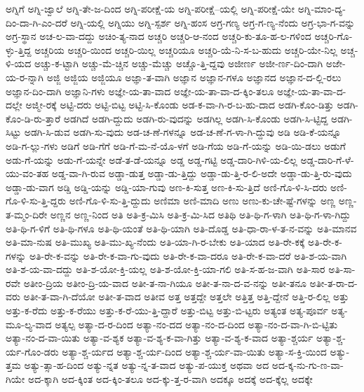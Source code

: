 {ಅಗ್ನಿಗೆ
ಅಗ್ನಿ-ಜ್ವಾಲೆ
ಅಗ್ನಿ-ತೇ-ಜ-ದಿಂದ
ಅಗ್ನಿ-ಪರೀಕ್ಷೆ-ಯ
ಅಗ್ನಿ-ಪರೀಕ್ಷೆ--ಯಲ್ಲಿ
ಅಗ್ನಿ-ಪರೀಕ್ಷೆ-ಯೇ
ಅಗ್ನಿ-ಮಾಂ-ದ್ಯ-ದಿಂ-ದಾ-ಗಿ-ಎಂ-ದರೆ
ಅಗ್ನಿ-ಯಲ್ಲಿ
ಅಗ್ನಿಯು
ಅಗ್ನಿ-ಸ್ಪರ್ಶ
ಅಗ್ನಿ-ಹಂಸ
ಅಗ್ರ-ಗಣ್ಯ
ಅಗ್ರ-ಗ-ಣ್ಯ-ನೆಂದು
ಅಗ್ರ-ಭಾ-ಗ-ವನ್ನು
ಅಗ್ರ-ಸ್ಥಾನ
ಅಚ-ಲ-ವಾ-ದದ್ದು
ಅಚಿಂ-ತ್ಯ-ನಾದ
ಅಚ್ಚರಿ
ಅಚ್ಚರಿ-ಆ-ನಂದ
ಅಚ್ಚರಿ-ಕು-ತೂ-ಹ-ಲ-ಗಳಿಂದ
ಅಚ್ಚರಿ-ಗೊ-ಳ್ಳು-ತ್ತಿದ್ದ
ಅಚ್ಚರಿಯ
ಅಚ್ಚರಿ-ಯಿಂದ
ಅಚ್ಚರಿ-ಯಿಲ್ಲ
ಅಚ್ಚರಿಯೂ
ಅಚ್ಚರಿ-ಯೆ-ನಿ-ಸ-ಬ-ಹುದು
ಅಚ್ಚರಿ-ಯೇ-ನಿಲ್ಲ
ಅಚ್ಚ-ಳಿ-ಯದ
ಅಚ್ಚು-ಕ-ಟ್ಟಾಗಿ
ಅಚ್ಚು-ಮೆ-ಚ್ಚಿನ
ಅಚ್ಚು-ಮೆಚ್ಚು
ಅಚ್ಚೊ-ತ್ತಿ-ದ್ದವು
ಅಜೀರ್ಣ
ಅಜೀ-ರ್ಣ-ದಿಂ-ದಾಗಿ
ಅಜೇ-ಯ-ರ-ನ್ನಾಗಿ
ಅಜ್ಜಿ
ಅಜ್ಜಿಯ
ಅಜ್ಜಿಯೂ
ಅಜ್ಞಾ-ತ-ವಾಗಿ
ಅಜ್ಞಾನ
ಅಜ್ಞಾನ-ಗಳೂ
ಅಜ್ಞಾನದ
ಅಜ್ಞಾನ-ದ-ಲ್ಲಿ-ರಲು
ಅಜ್ಞಾನ-ದಿಂ-ದಾಗಿ
ಅಜ್ಞಾನಿ-ಗಳು
ಅಜ್ಞೇ-ಯ-ತಾ-ವಾದ
ಅಜ್ಞೇ-ಯ-ತಾ-ವಾ-ದ-ಕ್ಕಿಂ-ತಲೂ
ಅಜ್ಞೇ-ಯ-ತಾ-ವಾ-ದ-ದಲ್ಲೇ
ಅಜ್ಮೀ-ರಕ್ಕೆ
ಅಟ್ಟಿ-ದರು
ಅಟ್ಟಿ-ಬಿಟ್ಟ
ಅಟ್ಟಿ-ಸಿ-ಕೊಂಡು
ಅಡ-ಕ-ವಾ-ಗಿ-ರ-ಬ-ಹು-ದಾದ
ಅಡಗಿ-ಕೊಂ-ಡಿತ್ತು
ಅಡಗಿ-ಕೊಂ-ಡಿ-ರು-ತ್ತಾರೆ
ಅಡಗಿದೆ
ಅಡಗಿ-ದ್ದುದು
ಅಡಗಿ-ರು-ವುದನ್ನು
ಅಡಗಿಲ್ಲ
ಅಡಗಿ-ಸಿ-ಕೊಂಡು
ಅಡಗಿ-ಸಿ-ಟ್ಟಿದ್ದ
ಅಡಗಿ-ಸಿಟ್ಟು
ಅಡಗಿ-ಸಿ-ಡುವ
ಅಡಗಿ-ಸು-ವುದು
ಅಡ-ಚ-ಣೆ-ಗಳನ್ನೂ
ಅಡ-ಚ-ಣೆ-ಗ-ಳಾ-ಗಿ-ದ್ದುವು
ಅಡಿ
ಅಡಿ-ಕೆ-ಯನ್ನೂ
ಅಡಿ-ಗ-ಲ್ಲು-ಗಳು
ಅಡಿಗೆ
ಅಡಿ-ಗೆಗೆ
ಅಡಿ-ಗೆ-ಮ-ನೆ-ಯೊ-ಳಗೆ
ಅಡಿ-ಗೆಯ
ಅಡಿ-ಗೆ-ಯನ್ನು
ಅಡಿ-ಯಿ-ಡಲು
ಅಡುಗೆ
ಅಡು-ಗೆ-ಯನ್ನು
ಅಡು-ಗೆ-ಯನ್ನೇ
ಅಡೆ-ತ-ಡೆ-ಯನ್ನೂ
ಅಡ್ಡ
ಅಡ್ಡ-ಗಟ್ಟಿ
ಅಡ್ಡ-ದಾರಿ-ಗಿಳಿ-ಯ-ಲಿಲ್ಲ
ಅಡ್ಡ-ದಾರಿ-ಗೆ-ಳೆ-ಯು-ವಂ-ತಹ
ಅಡ್ಡ-ವಾ-ಗಿ-ರುವ
ಅಡ್ಡಾ-ಡುತ್ತ
ಅಡ್ಡಾ-ಡು-ತ್ತಿದ್ದು
ಅಡ್ಡಾ-ಡು-ತ್ತಿ-ರ-ಲಿ-ಅದೇ
ಅಡ್ಡಾ-ಡು-ತ್ತಿ-ರು-ವುದು
ಅಡ್ಡಾ-ಡು-ವಾಗ
ಅಡ್ಡಿ
ಅಡ್ಡಿ-ಯನ್ನು
ಅಡ್ಡಿ-ಯಾ-ಗುವು
ಅಣ-ಕಿ-ಸುತ್ತ
ಅಣ-ಕಿ-ಸು-ತ್ತಿದೆ
ಅಣಿ-ಗೊ-ಳಿ-ಸಿ-ದರು
ಅಣಿ-ಗೊ-ಳಿ-ಸು-ತ್ತಿ-ದ್ದರು
ಅಣಿ-ಗೊ-ಳಿ-ಸು-ತ್ತಿ-ದ್ದುದು
ಅಣಿಮಾ
ಅಣಿ-ಮಾದಿ
ಅಣು
ಅಣು-ಕು-ಚೇ-ಷ್ಟೆ-ಗಳನ್ನು
ಅಣ್ಣ
ಅಣ್ಣ-ತ-ಮ್ಮಂ-ದಿರೇ
ಅಣ್ಣನ
ಅಣ್ಣ-ನಿಂದ
ಅತಿ
ಅತಿ-ಕ್ರ-ಮಿಸಿ
ಅತಿ-ಕ್ರ-ಮಿ-ಸಿದ
ಅತಿಥಿ
ಅತಿ-ಥಿ-ಗ-ಳಾಗಿ
ಅತಿ-ಥಿ-ಗ-ಳಾ-ಗಿದ್ದು
ಅತಿ-ಥಿ-ಗ-ಳಿಗೆ
ಅತಿ-ಥಿ-ಗಳೂ
ಅತಿ-ಥಿ-ಯಂತೆ
ಅತಿ-ಥಿ-ಯಾಗಿ
ಅತಿ-ದೊಡ್ಡ
ಅತಿ-ಧಾ-ರಾ-ಳ-ತ-ನ-ವನ್ನು
ಅತಿ-ಮಾನವ
ಅತಿ-ಮಾ-ನುಷ
ಅತಿ-ಮುಖ್ಯ
ಅತಿ-ಮು-ಖ್ಯ-ನೆಂದು
ಅತಿ-ಯಾ-ಗಿ-ರ-ಬೇಕು
ಅತಿ-ಯಾದ
ಅತಿ-ರೇ-ಕಕ್ಕೆ
ಅತಿ-ರೇ-ಕ-ಗಳನ್ನು
ಅತಿ-ರೇ-ಕ-ವನ್ನು
ಅತಿ-ರೇ-ಕ-ವಾ-ಗು-ವುದು
ಅತಿ-ರೇ-ಕ-ವಾ-ದರೂ
ಅತಿ-ರೇ-ಕ-ವಾ-ದರೆ
ಅತಿ-ಶ-ಯ-ವಾಗಿ
ಅತಿ-ಶ-ಯ-ವಾ-ದದ್ದು
ಅತಿ-ಶ-ಯೋ-ಕ್ತಿ-ಯಲ್ಲ
ಅತಿ-ಶ-ಯೋ-ಕ್ತಿ-ಯಾ-ಗಲಿ
ಅತಿ-ಸ-ಹ-ಜ-ವಾಗಿ
ಅತಿ-ಸಾರ
ಅತಿ-ಸಾ-ರವೇ
ಅತೀಂ-ದ್ರಿಯ
ಅತೀಂ-ದ್ರಿ-ಯ-ವಾದ
ಅತೀ-ತ-ನಾ-ಗಿಯೂ
ಅತೀ-ತ-ನಾ-ದ-ವ-ನನ್ನು
ಅತೀ-ತನೂ
ಅತೀ-ತ-ರಾ-ದ-ವರು
ಅತೀ-ತ-ವಾ-ಗಿ-ದೆಯೋ
ಅತೀ-ತ-ವಾದ
ಅತೀವ
ಅತ್ತ
ಅತ್ತದ್ದೇ
ಅತ್ತಲೇ
ಅತ್ತಿತ್ತ
ಅತ್ತಿ-ದ್ದೇನೆ
ಅತ್ತಿ-ರ-ಲಿಲ್ಲ
ಅತ್ತು
ಅತ್ತು-ಕ-ರೆದು
ಅತ್ತು-ಕ-ರೆಯು
ಅತ್ತು-ಕ-ರೆ-ಯು-ತ್ತಿ-ದ್ದಾರೆ
ಅತ್ತು-ಬಿಟ್ಟ
ಅತ್ತು-ಬಿ-ಟ್ಟರು
ಅತ್ಯಂತ
ಅತ್ಯ-ಪೂರ್ವ
ಅತ್ಯ-ಮೂ-ಲ್ಯ-ವಾದ
ಅತ್ಯಲ್ಪ
ಅತ್ಯಾ-ದ-ರ-ದಿಂದ
ಅತ್ಯಾ-ನಂ-ದದ
ಅತ್ಯಾ-ನಂ-ದ-ದಿಂದ
ಅತ್ಯಾ-ನಂ-ದ-ವಾ-ಗಿ-ಬಿ-ಟ್ಟಿತು
ಅತ್ಯಾ-ನಂ-ದ-ವಾ-ಯಿತು
ಅತ್ಯಾ-ವ-ಶ್ಯಕ
ಅತ್ಯಾ-ವ-ಶ್ಯ-ಕ-ವಾ-ಗಿತ್ತು
ಅತ್ಯಾ-ವ-ಶ್ಯ-ಕ-ವಾದ
ಅತ್ಯಾ-ಶ್ಚರ್ಯ
ಅತ್ಯಾ-ಶ್ಚ-ರ್ಯ-ಗೊಂ-ಡರು
ಅತ್ಯಾ-ಶ್ಚ-ರ್ಯದ
ಅತ್ಯಾ-ಶ್ಚ-ರ್ಯ-ದಿಂದ
ಅತ್ಯಾ-ಶ್ಚ-ರ್ಯ-ವಾ-ಯಿತು
ಅತ್ಯಾ-ಸ-ಕ್ತಿ-ಯಿಂದ
ಅತ್ಯು-ತ್ತಮ
ಅತ್ಯು-ತ್ಸಾ-ಹ-ದಿಂದ
ಅತ್ಯು-ನ್ನತ
ಅತ್ಯು-ನ್ನ-ತ-ವಾದ
ಅತ್ಯು-ಪ-ಯುಕ್ತ
ಅಥವಾ
ಅದ
ಅದ-ಕ್ಕ-ನು-ಗು-ಣ-ವಾ-ಗಿಯೇ
ಅದ-ಕ್ಕಾಗಿ
ಅದ-ಕ್ಕಿಂತ
ಅದ-ಕ್ಕಿಂ-ತಲೂ
ಅದ-ಕ್ಕು-ತ್ತ-ರ-ವಾಗಿ
ಅದಕ್ಕೂ
ಅದಕ್ಕೆ
ಅದ-ಕ್ಕೆಲ್ಲ
ಅದಕ್ಕೇ
}
